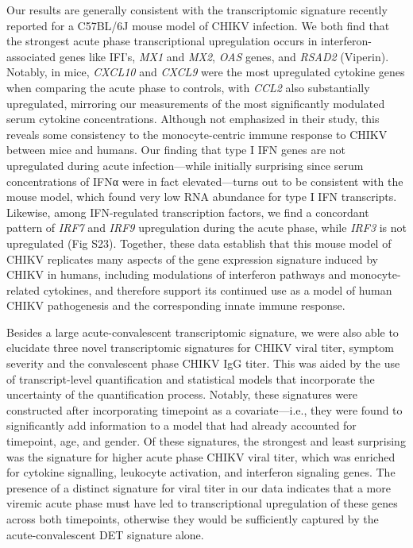 Our results are generally consistent with the transcriptomic signature recently reported for a C57BL/6J mouse model of CHIKV infection.\autocite{Wilson2017} We both find that the strongest acute phase transcriptional upregulation occurs in interferon-associated genes like IFI’s, \emph{MX1} and \emph{MX2}, \emph{OAS} genes, and \emph{RSAD2} (Viperin).\autocite{Wilson2017} Notably, in mice, \emph{CXCL10} and \emph{CXCL9} were the most upregulated cytokine genes when comparing the acute phase to controls, with \emph{CCL2} also substantially upregulated,\autocite{Wilson2017} mirroring our measurements of the most significantly modulated serum cytokine concentrations. Although not emphasized in their study, this reveals some consistency to the monocyte-\allowbreak centric immune response to CHIKV between mice and humans. Our finding that type I IFN genes are not upregulated during acute infection—while initially surprising since serum concentrations of IFNα were in fact elevated—turns out to be consistent with the mouse model, which found very low RNA abundance for type I IFN transcripts.\autocite{Wilson2017} Likewise, among IFN-regulated transcription factors, we find a concordant pattern of \emph{IRF7} and \emph{IRF9} upregulation during the acute phase, while \emph{IRF3} is not upregulated (Fig S23). Together, these data establish that this mouse model of CHIKV replicates many aspects of the gene expression signature induced by CHIKV in humans, including modulations of interferon pathways and monocyte-related cytokines, and therefore support its continued use as a model of human CHIKV pathogenesis and the corresponding innate immune response.

Besides a large acute-convalescent transcriptomic signature, we were also able to elucidate three novel transcriptomic signatures for CHIKV viral titer, symptom severity and the convalescent phase CHIKV IgG titer. This was aided by the use of transcript-level quantification and statistical models that incorporate the uncertainty of the quantification process.\autocite{Pimentel2016} Notably, these signatures were constructed after incorporating timepoint as a covariate—i.e., they were found to significantly add information to a model that had already accounted for timepoint, age, and gender. Of these signatures, the strongest and least surprising was the signature for higher acute phase CHIKV viral titer, which was enriched for cytokine signalling, leukocyte activation, and interferon signaling genes. The presence of a distinct signature for viral titer in our data indicates that a more viremic acute phase must have led to transcriptional upregulation of these genes across both timepoints, otherwise they would be sufficiently captured by the acute-convalescent DET signature alone.

